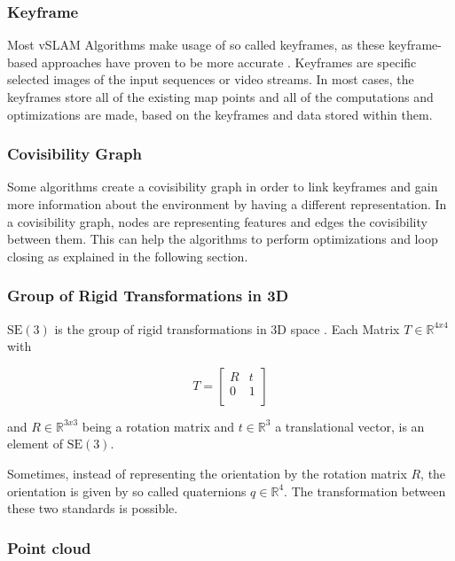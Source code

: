 		\subsubsection{Keyframe}
		
		Most vSLAM Algorithms make usage of so called keyframes, as these keyframe-based approaches have proven to be more accurate \cite{keyframe}.
		Keyframes are specific selected images of the input sequences or video streams. In most cases, the keyframes store all of the existing 
		map points and all of the computations and optimizations are made, based on the keyframes and data stored within them. 
	
		\subsubsection{Covisibility Graph}
		
		Some algorithms create a covisibility graph in order to link keyframes and gain more information about the environment by having a different representation. 
		In a covisibility graph, nodes are representing features and edges the covisibility between them. 
		This can help the algorithms to perform optimizations and loop closing as explained in the following section.
		
		\subsubsection{Group of Rigid Transformations in 3D}\label{pose}
		
		$\text{SE}(3)$ is the group of rigid transformations in 3D space \cite{se3}. Each Matrix $ T \in \mathbb{R}^{4x4}$ with 
		
		$$ T = \left[
		\begin{array}{rrr}
		R &  t \\  
		0  & 1 \\ 
		\end{array} \right]$$
		
		and $ R \in \mathbb{R}^{3x3}$ being a rotation matrix and $ t \in \mathbb{R}^{3}$ a translational vector, is an element of $\text{SE}(3)$.
		
		Sometimes, instead of representing the orientation by the rotation matrix $R$, the orientation is given by so called quaternions $q \in \mathbb{R}^4$. 
		The transformation between these two standards is possible. 
		
		\subsubsection{Point cloud}
		
